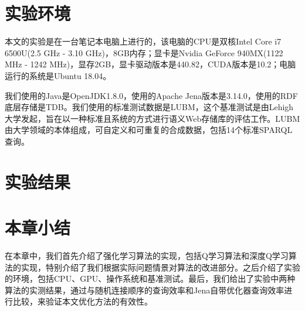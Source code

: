 \section{实验环境}
本文的实验是在一台笔记本电脑上进行的，该电脑的CPU是双核Intel Core i7 6500U(2.5 GHz - 3.10 GHz)，8GB内存；显卡是Nvidia GeForce 940MX(1122 MHz - 1242 MHz)，显存2GB，显卡驱动版本是440.82，CUDA版本是10.2；电脑运行的系统是Ubuntu 18.04。

我们使用的Java是OpenJDK1.8.0，使用的Apache Jena版本是3.14.0，使用的RDF底层存储是TDB。我们使用的标准测试数据是LUBM\cite{LUBM}，这个基准测试是由Lehigh大学发起，旨在以一种标准且系统的方式进行语义Web存储库的评估工作。LUBM由大学领域的本体组成，可自定义和可重复的合成数据，包括14个标准SPARQL查询。
\section{实验结果}

\section{本章小结}
在本章中，我们首先介绍了强化学习算法的实现，包括Q学习算法和深度Q学习算法的实现，特别介绍了我们根据实际问题情景对算法的改进部分。之后介绍了实验的环境，包括CPU、GPU、操作系统和基准测试。最后，我们给出了实验中两种算法的实测结果，通过与随机连接顺序的查询效率和Jena自带优化器查询效率进行比较，来验证本文优化方法的有效性。
